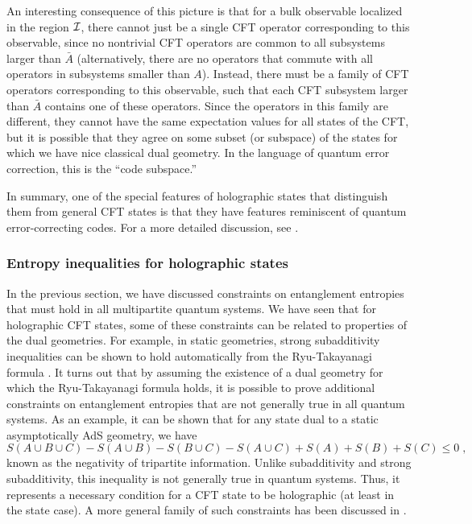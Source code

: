 \documentclass[12pt,epsf]{article}
\newcommand{\be}{\begin{equation}}
\newcommand{\ee}{\end{equation}}
\begin{document}
An interesting consequence of this picture is that for a bulk observable localized in the region ${\cal I}$, there cannot just be a single CFT operator corresponding to this observable, since no nontrivial CFT operators are common to all subsystems larger than $\bar{A}$ (alternatively, there are no operators that commute with all operators in subsystems smaller than $A$). Instead, there must be a family of CFT operators corresponding to this observable, such that each CFT subsystem larger than $\bar{A}$ contains one of these operators. Since the operators in this family are different, they cannot have the same expectation values for all states of the CFT, but it is possible that they agree on some subset (or subspace) of the states for which we have nice classical dual geometry. In the language of quantum error correction, this is the ``code subspace.''

In summary, one of the special features of holographic states that distinguish them from general CFT states is that they have features reminiscent of quantum error-correcting codes. For a more detailed discussion, see \cite{Almheiri:2014lwa,Pastawski:2015qua}.

\subsubsection*{Entropy inequalities for holographic states}

In the previous section, we have discussed constraints on entanglement entropies that must hold in all multipartite quantum systems. We have seen that for holographic CFT states, some of these constraints can be related to properties of the dual geometries. For example, in static geometries, strong subadditivity inequalities can be shown to hold automatically from the Ryu-Takayanagi formula \cite{headrick2007holographic}. It turns out that by assuming the existence of a dual geometry for which the Ryu-Takayanagi formula holds, it is possible to prove additional constraints on entanglement entropies that are not generally true in all quantum systems. As an example, it can be shown \cite{Hayden:2011ag} that for any state dual to a static asymptotically AdS geometry, we have
\be
S(A \cup B \cup C) - S(A \cup B) - S(B \cup C) - S(A \cup C) + S(A) + S(B) + S(C) \le 0 \; ,
\ee
known as the negativity of tripartite information. Unlike subadditivity and strong subadditivity, this inequality is not generally true in quantum systems. Thus, it represents a necessary condition for a CFT state to be holographic (at least in the state case). A more general family of such constraints has been discussed in \cite{Bao:2015bfa}.
\end{document}
